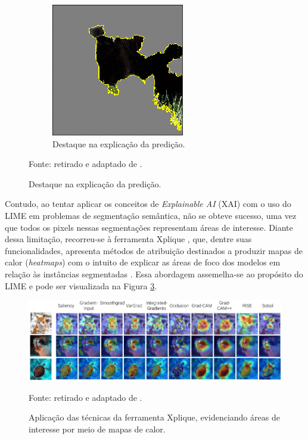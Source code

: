 \begin{figure}[H]
\begin{subfigure}[t]{0.5\textwidth}
        \includegraphics[width=1\linewidth]{recursos/imagens/project/mascara_gato.png}
        \caption{Destaque na explicação da predição.}
        \label{project:fig:explain:lime2.2}
    \end{subfigure}%

    Fonte: retirado e adaptado de \cite{Ribeiro2016WhyClassifier}.
\end{figure}

Contudo, ao tentar aplicar os conceitos de \textit{Explainable AI} (XAI) com o uso do LIME em problemas de segmentação semântica, não se obteve sucesso, uma vez que todos os pixels nessas segmentações representam áreas de interesse. Diante dessa limitação, recorreu-se à ferramenta Xplique \citep{Fel2022Xplique:Toolbox}, que, dentre suas funcionalidades, apresenta métodos de atribuição destinados a produzir mapas de calor (\textit{heatmaps}) com o intuito de explicar as áreas de foco dos modelos em relação às instâncias segmentadas \citep{Fel2022Xplique:Toolbox}. Essa abordagem assemelha-se ao propósito do LIME e pode ser visualizada na Figura \ref{project:fig:explain:xplique}.

\begin{figure}[H]
    \centering
    \caption{Aplicação das técnicas da ferramenta Xplique, evidenciando áreas de interesse por meio de mapas de calor.}
    \includegraphics[width=1\textwidth]{recursos/imagens/project/xplique.png}
    \label{project:fig:explain:xplique}

    Fonte: retirado e adaptado de \cite{Fel2022Xplique:Toolbox}.
\end{figure}

